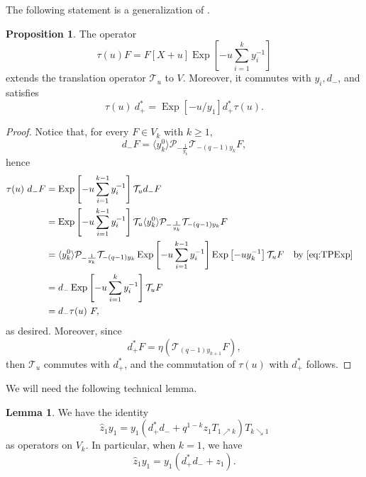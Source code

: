 \documentclass[reqno]{amsart}
\theoremstyle{plain}
\theoremstyle{definition}
\newtheorem{lemma}[theorem]{Lemma}
\newtheorem{proposition}[theorem]{Proposition}
\theoremstyle{remark}
\DeclareMathOperator{\Exp}{Exp}
\newcommand{\z}{\widehat{z}}
\newcommand{\<}{\langle}
\renewcommand{\>}{\rangle}
\begin{document}
The following statement is a generalization of \cite[Proposition~3.24]{Mellit2021Rational}.

\begin{proposition}
    \label{prop:tau}
    The operator
    \[ \tau(u) F = F[X+u] \Exp\left[- u \sum_{i=1}^k y_i^{-1}\right] \]
    extends the translation operator $\mathcal{T}_{u}$ to $V$. Moreover, it commutes with $y_i, d_-$, and satisfies
    \[ \tau(u)\ d_+^* = \Exp[-u/y_1] d_+^* \tau(u). \]
\end{proposition}

\begin{proof}
    Notice that, for every $F \in V_k$ with $k \geq 1$,
    \[ d_- F =\langle y_k^0 \rangle\mathcal{P}_{-\frac{1}{y_k}} \mathcal{T}_{-(q-1)y_k}F, \]
    hence
    \begin{align*}
        \tau(u)\ d_- F & = \Exp\left[- u \sum_{i=1}^{k-1} y_i^{-1}\right] \mathcal{T}_{u} d_- F \\
        & = \Exp\left[- u \sum_{i=1}^{k-1} y_i^{-1}\right] \mathcal{T}_{u} \langle y_k^0 \rangle\mathcal{P}_{-\frac{1}{y_k}} \mathcal{T}_{-(q-1)y_k} F \\
        & = \langle y_k^0 \rangle\mathcal{P}_{-\frac{1}{y_k}} \mathcal{T}_{-(q-1)y_k} \Exp\left[- u \sum_{i=1}^{k-1} y_i^{-1}\right] \Exp \left[-u y_k^{-1}\right] \mathcal{T}_{u} F && \text{by \eqref{eq:TPExp}} \\
        & = d_- \Exp\left[- u \sum_{i=1}^{k} y_i^{-1}\right] \mathcal{T}_{u} F \\
        & = d_- \tau(u)\ F,
    \end{align*}
    as desired. Moreover, since
    \[ d_+^* F = \eta(\mathcal{T}_{(q-1)y_{k+1}} F), \]
    then $\mathcal{T}_{u}$ commutes with $d_+^*$, and the commutation of $\tau(u)$ with $d_+^*$ follows.
\end{proof}

We will need the following technical lemma.

\begin{lemma}
    \label{lemma:yz_commutation}
    We have the identity \[ \z_1 y_1 = y_1 (d_+^* d_- + q^{1-k} z_1 T_{1 \nearrow k}) T_{k \searrow 1} \] as operators on $V_k$. In particular, when $k=1$, we have \[ \z_1 y_1 = y_1 (d_+^* d_- + z_1). \]
\end{lemma}
\end{document}
